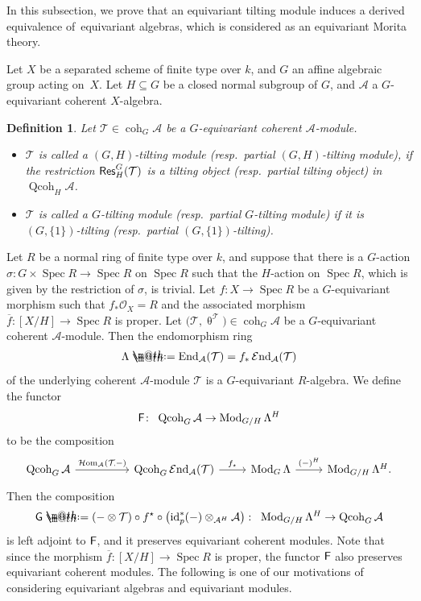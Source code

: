 \documentclass[10pt,a4paper]{amsart}
\makeatletter
\newtheorem{dfn}{Definition}[section]
\newcommand*{\defeq}{\mathrel{\rlap{%
 \raisebox{0.3ex}{$\m@th\cdot$}}%
 \raisebox{-0.3ex}{$\m@th\cdot$}}%
 =}
\numberwithin{equation}{section}
\newcommand{\Spec}{\operatorname{Spec}}
\newcommand{\cHom}{\operatorname{{\mathcal H}om}}
\newcommand{\End}{\operatorname{End}}
\newcommand{\cEnd}{\operatorname{{\mathcal E}nd}}
\newcommand{\coh}{\operatorname{coh}}
\newcommand{\Qcoh}{\operatorname{Qcoh}}
\newcommand{\Mod}{\operatorname{Mod}}
\newcommand{\id}{\operatorname{id}}
\newcommand{\Res}{\operatorname{\sf Res}}
\newcommand{\cA}{\mathcal{A}}
\newcommand{\cO}{\mathcal{O}}
\newcommand{\cT}{\mathcal{T}}
\newcommand{\F}{\operatorname{\sf{F}}}
\newcommand{\G}{\operatorname{\sf{G}}}
\makeatother
\begin{document}
In this subsection, we prove that an equivariant tilting module induces a derived equivalence of~equivariant algebras, which is considered as an equivariant Morita theory.

Let $X$ be a separated scheme of finite type over $k$, and $G$ an affine algebraic group acting on~$X$.
Let $H\subseteq G$ be a closed normal subgroup of $G$, and $\cA$ a $G$-equivariant coherent $X$-algebra.

\begin{dfn}
Let $\cT\in \coh_G\cA$ be a $G$-equivariant coherent $\cA$-module.
\begin{itemize}\itemsep=0pt
\item[1.] $\cT$ is called a {\it $(G,H)$-tilting module} (resp.\ {\it partial $(G,H)$-tilting module}), if the restriction $\Res^G_H(\cT)$ is a tilting object (resp.\ partial tilting object) in $\Qcoh_H\cA$.
\item[2.] $\cT$ is called a {\it $G$-tilting module} (resp.\ {\it partial $G$-tilting module}) if it is $(G,\{1\})$-tilting (resp.\ partial $(G,\{1\})$-tilting).
\end{itemize}
\end{dfn}
Let $R$ be a normal ring of finite type over $k$, and suppose that there is a $G$-action $\sigma\colon G\times \Spec R\to \Spec R$ on $\Spec R$ such that the $H$-action on $\Spec R$, which is given by the restriction of $\sigma$, is trivial. Let $f\colon X\to \Spec R$ be a $G$-equivariant morphism such that $f_*\cO_X=R$ and the associated morphism $\overline{f}\colon [X/H]\to \Spec R$ is proper. Let $\big(\cT,\uptheta^{\cT}\big)\in \coh_G\cA$ be
a $G$-equivariant coherent $\cA$-module. Then the endomorphism ring
\begin{gather*}
\Lambda\defeq\End_{\cA}(\cT)=f_*\cEnd_{\cA}(\cT)
\end{gather*}
of the underlying coherent $\cA$-module $\cT$ is a $G$-equivariant $R$-algebra.
We define the functor
\begin{gather*}
\F\colon\ \Qcoh_G\cA\to \Mod_{G/H}\Lambda^H
\end{gather*}
to be the composition
\[
\begin{tikzcd}
\Qcoh_G\cA\arrow[rr,"\cHom_{\cA}(\cT\mbox{\hspace{-0.5mm}\tiny ,}-)"]&&\Qcoh_G\cEnd_{\cA}(\cT)\arrow[r,"f_{\star}"]&\Mod_G\Lambda\arrow[r,"(-)^H"]&\Mod_{G/H}\Lambda^H.
\end{tikzcd}
\]
Then the composition
\begin{gather*}
\G\defeq\left(-\otimes \cT\right)\circ f^{\star}\circ \left(\id_p^*(-)\otimes_{\cA^H}\cA\right) \colon\ \Mod_{G/H}\Lambda^H\to \Qcoh_G\cA
\end{gather*}
is left adjoint to $\F$, and it preserves equivariant coherent modules. Note that since the morphism $\overline{f}\colon [X/H]\to \Spec R$ is proper, the functor $\F$ also preserves equivariant coherent modules. The following is one of our motivations of considering equivariant algebras and equivariant modules.
\end{document}
